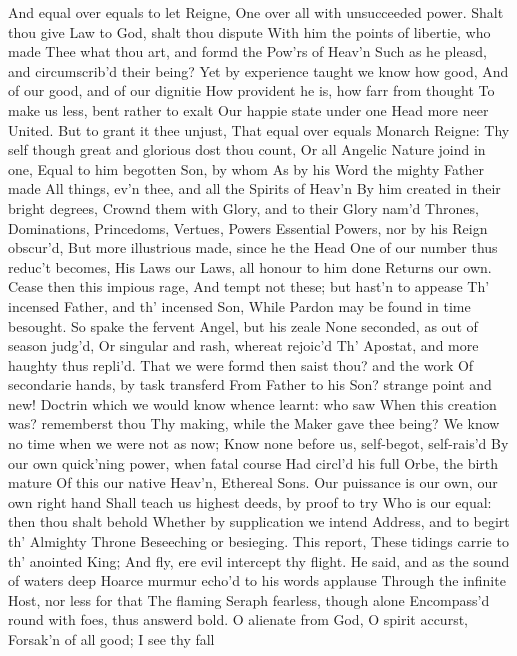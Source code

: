 \documentclass[11pt]{book}
\begin{document}
And equal over equals to let Reigne, 
One over all with unsucceeded power. 
Shalt thou give Law to God, shalt thou dispute 
With him the points of libertie, who made 
Thee what thou art, and formd the Pow'rs of Heav'n 
Such as he pleasd, and circumscrib'd their being? 
Yet by experience taught we know how good, 
And of our good, and of our dignitie 
How provident he is, how farr from thought 
To make us less, bent rather to exalt 
Our happie state under one Head more neer 
United.  But to grant it thee unjust, 
That equal over equals Monarch Reigne: 
Thy self though great and glorious dost thou count, 
Or all Angelic Nature joind in one, 
Equal to him begotten Son, by whom 
As by his Word the mighty Father made 
All things, ev'n thee, and all the Spirits of Heav'n 
By him created in their bright degrees, 
Crownd them with Glory, and to their Glory nam'd 
Thrones, Dominations, Princedoms, Vertues, Powers 
Essential Powers, nor by his Reign obscur'd, 
But more illustrious made, since he the Head 
One of our number thus reduc't becomes, 
His Laws our Laws, all honour to him done 
Returns our own.  Cease then this impious rage, 
And tempt not these; but hast'n to appease 
Th' incensed Father, and th' incensed Son, 
While Pardon may be found in time besought. 
\quad So spake the fervent Angel, but his zeale 
None seconded, as out of season judg'd, 
Or singular and rash, whereat rejoic'd 
Th' Apostat, and more haughty thus repli'd. 
That we were formd then saist thou? and the work 
Of secondarie hands, by task transferd 
From Father to his Son? strange point and new! 
Doctrin which we would know whence learnt: who saw 
When this creation was? rememberst thou 
Thy making, while the Maker gave thee being? 
We know no time when we were not as now; 
Know none before us, self-begot, self-rais'd 
By our own quick'ning power, when fatal course 
Had circl'd his full Orbe, the birth mature 
Of this our native Heav'n, Ethereal Sons. 
Our puissance is our own, our own right hand 
Shall teach us highest deeds, by proof to try 
Who is our equal: then thou shalt behold 
Whether by supplication we intend 
Address, and to begirt th' Almighty Throne 
Beseeching or besieging.  This report, 
These tidings carrie to th' anointed King; 
And fly, ere evil intercept thy flight. 
\quad He said, and as the sound of waters deep 
Hoarce murmur echo'd to his words applause 
Through the infinite Host, nor less for that 
The flaming Seraph fearless, though alone 
Encompass'd round with foes, thus answerd bold. 
\quad O alienate from God, O spirit accurst, 
Forsak'n of all good; I see thy fall 
\end{document}
